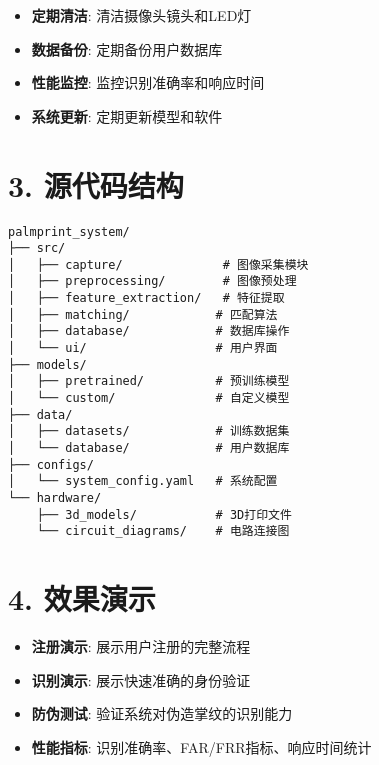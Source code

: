 \begin{itemize}
\tightlist
\item
  \textbf{定期清洁}: 清洁摄像头镜头和LED灯
\item
  \textbf{数据备份}: 定期备份用户数据库
\item
  \textbf{性能监控}: 监控识别准确率和响应时间
\item
  \textbf{系统更新}: 定期更新模型和软件
\end{itemize}

\section{3. 源代码结构}\label{ux6e90ux4ee3ux7801ux7ed3ux6784}

\begin{lstlisting}
palmprint_system/
├── src/
│   ├── capture/              # 图像采集模块
│   ├── preprocessing/        # 图像预处理
│   ├── feature_extraction/   # 特征提取
│   ├── matching/            # 匹配算法
│   ├── database/            # 数据库操作
│   └── ui/                  # 用户界面
├── models/
│   ├── pretrained/          # 预训练模型
│   └── custom/              # 自定义模型
├── data/
│   ├── datasets/            # 训练数据集
│   └── database/            # 用户数据库
├── configs/
│   └── system_config.yaml   # 系统配置
└── hardware/
    ├── 3d_models/           # 3D打印文件
    └── circuit_diagrams/    # 电路连接图
\end{lstlisting}

\section{4. 效果演示}\label{ux6548ux679cux6f14ux793a}

\begin{itemize}
\tightlist
\item
  \textbf{注册演示}: 展示用户注册的完整流程
\item
  \textbf{识别演示}: 展示快速准确的身份验证
\item
  \textbf{防伪测试}: 验证系统对伪造掌纹的识别能力
\item
  \textbf{性能指标}: 识别准确率、FAR/FRR指标、响应时间统计
\end{itemize}
